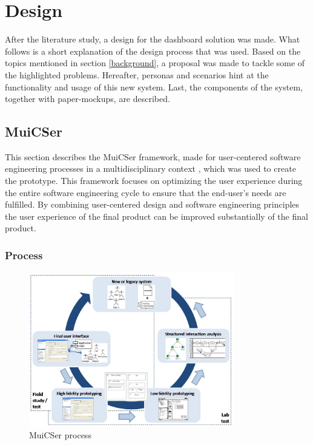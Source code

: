 \section{Design} \label{design}

After the literature study, a design for the dashboard solution was made. What follows is a short explanation of the design process that was used. Based on the topics mentioned in section \ref{background}, a proposal was made to tackle some of the highlighted problems. Hereafter, personas and scenarios hint at the functionality and usage of this new system. Last, the components of the system, together with paper-mockups, are described.

    \subsection{MuiCSer} \label{2_muicser}
    This section describes the MuiCSer framework, made for user-centered software engineering processes in a multidisciplinary context \cite{muicser}, which was used to create the prototype. This framework focuses on optimizing the user experience during the entire software engineering cycle to ensure that the end-user's needs are fulfilled. By combining user-centered design and software engineering principles the user experience of the final product can be improved substantially of the final product.

        \subsubsection{Process}
        
        \begin{figure}[!t]
            \centering
            \includegraphics[width=0.8\textwidth]{chapters/3_design/muicser}
            \caption{MuiCSer process}\label{fig:muicser}
        \end{figure}

